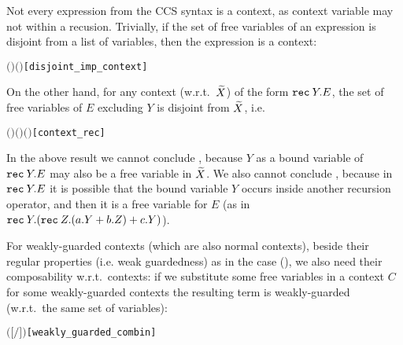 Not every expression from the CCS syntax is a context, as 
context variable may not within a recusion. Trivially,
 if the set of free variables of an expression
is disjoint from a list of variables, then the expression is a context:
\begin{alltt}
\HOLTokenTurnstile{}  \ensuremath{(} \ensuremath{)} \ensuremath{(} \ensuremath{)} \HOLSymConst{\HOLTokenImp{}}   \hfill{[disjoint_imp_context]}
\end{alltt}
On the other hand, for any context (w.r.t.~$\widetilde X$) of the form ${\tt rec}\: Y . E$,
the set of free variables of $E$ excluding $Y$ is
disjoint from $\widetilde X$, i.e.
\begin{alltt}
\HOLTokenTurnstile{}   \ensuremath{(}  \ensuremath{)} \HOLSymConst{\HOLTokenImp{}}  \ensuremath{(}   \ensuremath{)} \ensuremath{(} \ensuremath{)}\hfill{[context_rec]}
\end{alltt}
In the above result we cannot
conclude , because $Y$ as a bound
variable of ${\tt rec}\: Y . E$ may also be a free variable in $\widetilde X$. We
also cannot conclude , because in ${\tt rec}\: Y . E$
it is possible that the bound variable $Y$ occurs inside another
recursion operator, and then it is a free variable for $E$ (as in ${\tt rec}\: Y . ({\tt rec}\: Z . (a.Y + b.Z) + c.Y)$).

For weakly-guarded contexts (which are also normal contexts), beside
their regular properties (i.e. weak
guardedness) as in the \univariate case (), we also need
their composability w.r.t.~\multivariate contexts: if we
substitute some free variables in a context $C$ for some weakly-guarded
contexts the resulting term is weakly-guarded (w.r.t.~the same set of variables):
\begin{alltt}
\HOLTokenTurnstile{}   \HOLSymConst{\HOLTokenConj{}}    \HOLSymConst{\HOLTokenConj{}}    \HOLSymConst{\HOLTokenConj{}}
     \HOLSymConst{\ensuremath{=}}   \HOLSymConst{\HOLTokenImp{}}
     \ensuremath{(}\ensuremath{[}\ensuremath{/}\ensuremath{]} \ensuremath{)}\hfill{[weakly_guarded_combin]}
\end{alltt}

